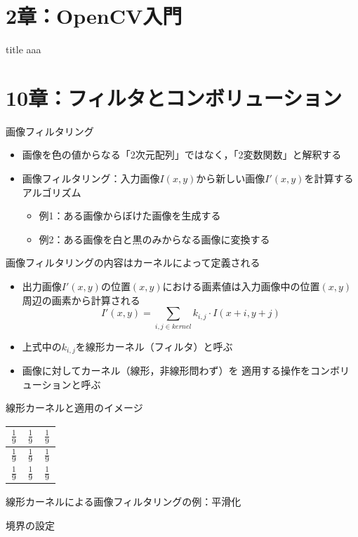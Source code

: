 \documentclass[10pt]{beamer}
\newcommand{\mymain}[1]{\textcolor{mLightBrown}{#1}}
\begin{document}
	\section{2章：OpenCV入門}
	
	\begin{frame}{title}
		aaa
	\end{frame}
	
	\section{10章：フィルタとコンボリューション}
	
	\begin{frame}{画像フィルタリング}
		\begin{itemize}
			\item 画像を色の値からなる「2次元配列」ではなく，「2変数関数」と解釈する
			\item 画像フィルタリング：入力画像$I(x, y)$から新しい画像$I'(x, y)$を計算するアルゴリズム
				\begin{itemize}
					\item 例1：ある画像からぼけた画像を生成する
					\item 例2：ある画像を白と黒のみからなる画像に変換する
				\end{itemize}
		\end{itemize}
	\end{frame}
	
	\begin{frame}{画像フィルタリングの内容はカーネルによって定義される}
		\begin{itemize}
			\item 出力画像$I'(x, y)$の位置$(x, y)$における画素値は入力画像中の位置$(x, y)$周辺の画素から計算される
			\[ I'(x, y) = \sum_{i, j \in \mathit{kernel}} k_{i, j} \cdot I(x + i, y + j) \]
			\item 上式中の$k_{i, j}$を\mymain{線形カーネル（フィルタ）}と呼ぶ
			\item 画像に対してカーネル（線形，非線形問わず）を
				適用する操作を\mymain{コンボリューション}と呼ぶ
		\end{itemize}
	\end{frame}

	\begin{frame}{線形カーネルと適用のイメージ}
		\begin{center}
			\begin{tabular}{|c|c|c|}\hline
				$\frac{1}{9}$ & $\frac{1}{9}$ & $\frac{1}{9}$ \\ \hline
				$\frac{1}{9}$ & $\frac{1}{9}$ & $\frac{1}{9}$ \\ \hline
				$\frac{1}{9}$ & $\frac{1}{9}$ & $\frac{1}{9}$ \\ \hline
			\end{tabular}
		\end{center}
	\end{frame}

	\begin{frame}[fragile]{線形カーネルによる画像フィルタリングの例：平滑化}

	\end{frame}
	
	\begin{frame}{境界の設定}
		
	\end{frame}
\end{document}
